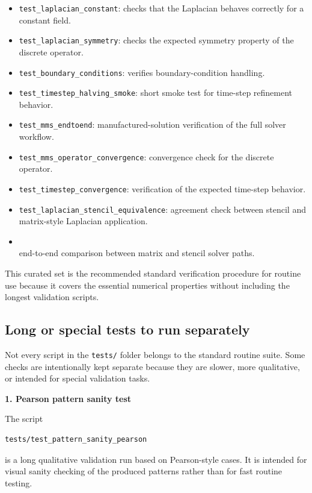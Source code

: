 \begin{itemize}
    \item \texttt{test\_laplacian\_constant}: checks that the Laplacian behaves correctly for a constant field.
    \item \texttt{test\_laplacian\_symmetry}: checks the expected symmetry property of the discrete operator.
    \item \texttt{test\_boundary\_conditions}: verifies boundary-condition handling.
    \item \texttt{test\_timestep\_halving\_smoke}: short smoke test for time-step refinement behavior.
    \item \texttt{test\_mms\_endtoend}: manufactured-solution verification of the full solver workflow.
    \item \texttt{test\_mms\_operator\_convergence}: convergence check for the discrete operator.
    \item \texttt{test\_timestep\_convergence}: verification of the expected time-step behavior.
    \item \texttt{test\_laplacian\_stencil\_equivalence}: agreement check between stencil and matrix-style Laplacian application.
    \item {}\\
    end-to-end comparison between matrix and stencil solver paths.
\end{itemize}

This curated set is the recommended standard verification procedure for routine use because it covers the essential numerical properties without including the longest validation scripts.

\subsection*{Long or special tests to run separately}

Not every script in the \texttt{tests/} folder belongs to the standard routine suite. Some checks are intentionally kept separate because they are slower, more qualitative, or intended for special validation tasks.

\textbf{1. Pearson pattern sanity test}

The script

\begin{verbatim}
tests/test_pattern_sanity_pearson
\end{verbatim}

is a long qualitative validation run based on Pearson-style cases. It is intended for visual sanity checking of the produced patterns rather than for fast routine testing.

